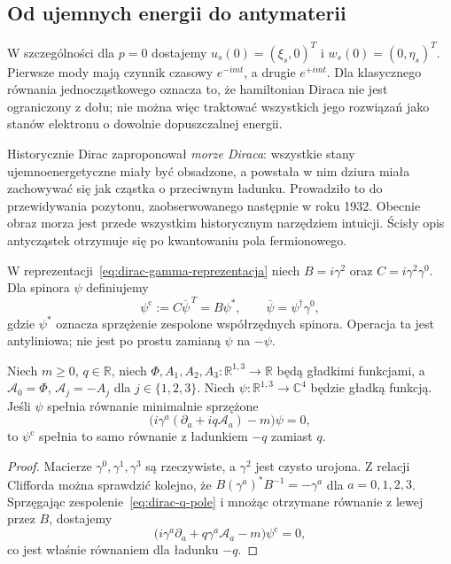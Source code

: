 \subsection{Od ujemnych energii do antymaterii}
\label{subsec:dirac-antymateria}

W szczególności dla $p=0$ dostajemy
$u_s(0)=(\xi_s,0)^T$ i $w_s(0)=(0,\eta_s)^T$.
Pierwsze mody mają czynnik czasowy $e^{-imt}$,
a drugie $e^{+imt}$. Dla klasycznego równania
jednocząstkowego oznacza to, że hamiltonian
Diraca nie jest ograniczony z dołu; nie można
więc traktować wszystkich jego rozwiązań jako
stanów elektronu o dowolnie dopuszczalnej energii.

Historycznie Dirac zaproponował \emph{morze Diraca}:
wszystkie stany ujemnoenergetyczne miały być
obsadzone, a powstała w nim dziura miała
zachowywać się jak cząstka o przeciwnym ładunku.
Prowadziło to do przewidywania pozytonu,
zaobserwowanego następnie w roku 1932.
Obecnie obraz morza jest przede wszystkim
historycznym narzędziem intuicji.
Ścisły opis antycząstek otrzymuje się po
kwantowaniu pola fermionowego.

\begin{definicja}
\label{def:dirac-sprzezenie-ladunkowe}
W reprezentacji~\eqref{eq:dirac-gamma-reprezentacja}
niech $B=i\gamma^2$ oraz $C=i\gamma^2\gamma^0$.
Dla spinora $\psi$ definiujemy
\begin{equation}\label{eq:dirac-charge-conj}
 \psi^{\mathrm c}:=C\overline\psi^{\,T}
 =B\psi^*,\qquad \overline\psi=\psi^\dagger\gamma^0,
\end{equation}
gdzie $\psi^*$ oznacza sprzężenie zespolone
współrzędnych spinora. Operacja ta jest
antyliniowa; nie jest po prostu zamianą
$\psi$ na $-\psi$.
\end{definicja}

\begin{stwierdzenie}
\label{prop:dirac-sprzezenie-ladunku}
Niech $m\geq0$, $q\in\mathbb R$, niech
$\Phi,A_1,A_2,A_3:\mathbb R^{1,3}\to\mathbb R$
będą gładkimi funkcjami, a
$\mathcal A_0=\Phi$, $\mathcal A_j=-A_j$ dla
$j\in\{1,2,3\}$. Niech
$\psi:\mathbb R^{1,3}\to\mathbb C^4$ będzie gładką
funkcją. Jeśli $\psi$ spełnia równanie minimalnie sprzężone
\begin{equation}\label{eq:dirac-q-pole}
 \bigl(i\gamma^a(\partial_a+iq\mathcal A_a)-m\bigr)\psi=0,
\end{equation}
to $\psi^{\mathrm c}$ spełnia to samo równanie
z ładunkiem $-q$ zamiast $q$.
\end{stwierdzenie}
\begin{proof}
Macierze $\gamma^0,\gamma^1,\gamma^3$ są rzeczywiste,
a $\gamma^2$ jest czysto urojona.
Z relacji Clifforda można sprawdzić kolejno, że
$B(\gamma^a)^*B^{-1}=-\gamma^a$ dla $a=0,1,2,3$.
Sprzęgając zespolenie~\eqref{eq:dirac-q-pole}
i mnożąc otrzymane równanie z lewej przez $B$,
dostajemy
\[
 \bigl(i\gamma^a\partial_a
       +q\gamma^a\mathcal A_a-m\bigr)\psi^{\mathrm c}=0,
\]
co jest właśnie równaniem dla ładunku $-q$.
\end{proof}

